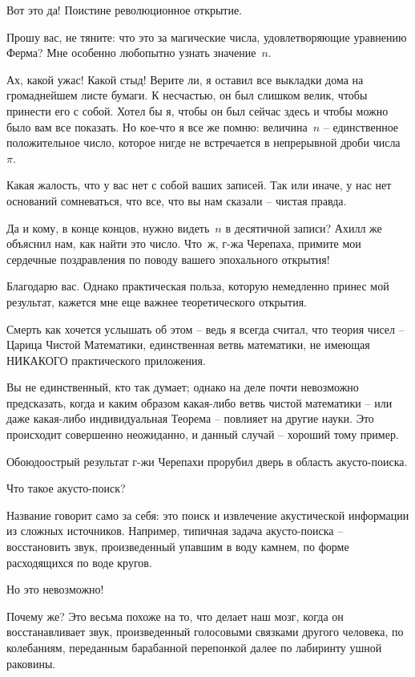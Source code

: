 \documentclass[../main.tex]{subfiles}
\begin{document}
\begin{dialogue}
 Вот это да! Поистине революционное открытие.

 Прошу вас, не тяните: что это за магические числа, удовлетворяющие уравнению Ферма? Мне особенно любопытно узнать значение~$n$.

 Ах, какой ужас! Какой стыд! Верите ли, я оставил все выкладки дома на громаднейшем листе бумаги. К несчастью, он был слишком велик, чтобы принести его с собой. Хотел бы я, чтобы он был сейчас здесь и чтобы можно было вам все показать. Но кое-что я все же помню: величина~$n$ \--- единственное положительное число, которое нигде не встречается в непрерывной дроби числа~$\pi$.

 Какая жалость, что у вас нет с собой ваших записей. Так или иначе, у нас нет оснований сомневаться, что все, что вы нам сказали \--- чистая правда.

 Да и кому, в конце концов, нужно видеть~$n$ в десятичной записи? Ахилл же объяснил нам, как найти это число. Что~ж, г-жа Черепаха, примите мои сердечные поздравления по поводу вашего эпохального открытия!

 Благодарю вас. Однако практическая польза, которую немедленно принес мой результат, кажется мне еще важнее теоретического открытия.

 Смерть как хочется услышать об этом \--- ведь я всегда считал, что теория чисел \--- Царица Чистой Математики, единственная ветвь математики, не имеющая НИКАКОГО практического приложения.

 Вы не единственный, кто так думает; однако на деле почти невозможно предсказать, когда и каким образом какая-либо ветвь чистой математики \--- или даже какая-либо индивидуальная Теорема \--- повлияет на другие науки. Это происходит совершенно неожиданно, и данный случай \--- хороший тому пример.

 Обоюдоострый результат г-жи Черепахи прорубил дверь в область акусто-поиска.

 Что такое акусто-поиск?

 Название говорит само за себя: это поиск и извлечение акустической информации из сложных источников. Например, типичная задача акусто-поиска \--- восстановить звук, произведенный упавшим в воду камнем, по форме расходящихся по воде кругов.

 Но это невозможно!

 Почему же? Это весьма похоже на то, что делает наш мозг, когда он восстанавливает звук, произведенный голосовыми связками другого человека, по колебаниям, переданным барабанной перепонкой далее по лабиринту ушной раковины.


\end{dialogue}
\end{document}
